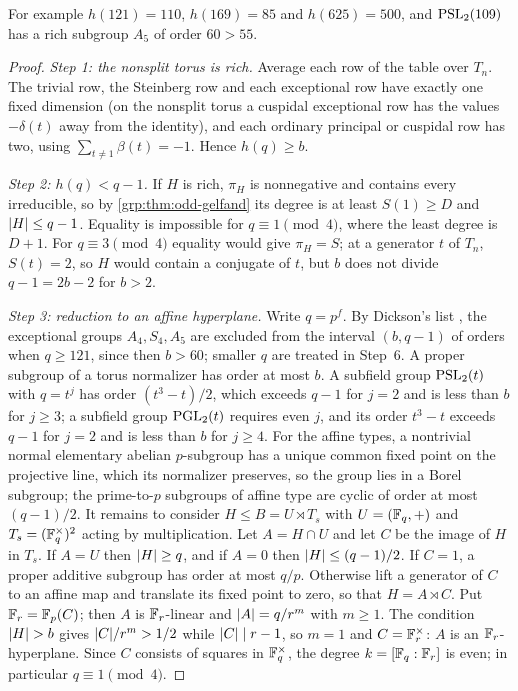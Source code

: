 For example $h(121)=110$, $h(169)=85$ and $h(625)=500$, and $\operatorname{PSL}_2(109)$ has
a rich subgroup $A_5$ of order $60>55$.

\begin{proof}
\emph{Step 1: the nonsplit torus is rich.} Average each row of the table over
$T_n$. The trivial row, the Steinberg row and each exceptional row have
exactly one fixed dimension (on the nonsplit torus a cuspidal exceptional row
has the values $-\delta(t)$ away from the identity), and each ordinary
principal or cuspidal row has two, using $\sum_{t\ne1}\beta(t)=-1$. Hence
$h(q)\ge b$.

\emph{Step 2: $h(q)<q-1$.} If $H$ is rich, $\pi_H$ is nonnegative and contains
every irreducible, so by \cref{grp:thm:odd-gelfand} its degree is at least
$S(1)\ge D$ and $\lvert H\rvert\le q-1$. Equality is impossible for
$q\equiv1\pmod4$, where the least degree is $D+1$. For $q\equiv3\pmod4$
equality would give $\pi_H=S$; at a generator $t$ of $T_n$, $S(t)=2$, so $H$
would contain a conjugate of $t$, but $b$ does not divide $q-1=2b-2$ for
$b>2$.

\emph{Step 3: reduction to an affine hyperplane.} Write $q=p^f$. By Dickson's
list \cite[Theorem~A.1]{GuralnickZieve2010Polynomials}, the exceptional groups
$A_4,S_4,A_5$ are excluded from the interval $(b,q-1)$ of orders when
$q\ge121$, since then $b>60$; smaller $q$ are treated in Step~6. A proper
subgroup of a torus normalizer has order at most $b$. A subfield group
$\operatorname{PSL}_2(t)$ with $q=t^j$ has order $(t^3-t)/2$, which exceeds $q-1$ for $j=2$
and is less than $b$ for $j\ge3$; a subfield group $\operatorname{PGL}_2(t)$ requires even
$j$, and its order $t^3-t$ exceeds $q-1$ for $j=2$ and is less than $b$ for
$j\ge4$. For the affine types, a nontrivial normal elementary abelian
$p$-subgroup has a unique common fixed point on the projective line, which
its normalizer preserves, so the group lies in a Borel subgroup; the
prime-to-$p$ subgroups of affine type are cyclic of order at most $(q-1)/2$.
It remains to consider $H\le B=U\rtimes T_s$ with $U=(\mathbb{F}_q,+)$ and
$T_s=(\mathbb{F}_q^\times)^2$ acting by multiplication. Let $A=H\cap U$ and let $C$ be
the image of $H$ in $T_s$. If $A=U$ then $\lvert H\rvert\ge q$, and if $A=0$ then
$\lvert H\rvert\le(q-1)/2$. If $C=1$, a proper additive subgroup has order at most
$q/p$. Otherwise lift a generator of $C$ to an affine map and translate its
fixed point to zero, so that $H=A\rtimes C$. Put $\mathbb{F}_r=\mathbb{F}_p(C)$; then $A$ is
$\mathbb{F}_r$-linear and $\lvert A\rvert=q/r^m$ with $m\ge1$. The condition $\lvert H\rvert>b$ gives
$\lvert C\rvert/r^m>1/2$ while $\lvert C\rvert\mid r-1$, so $m=1$ and $C=\mathbb{F}_r^\times$: $A$ is
an $\mathbb{F}_r$-hyperplane. Since $C$ consists of squares in $\mathbb{F}_q^\times$, the
degree $k=[\mathbb{F}_q:\mathbb{F}_r]$ is even; in particular $q\equiv1\pmod4$.


\end{proof}
